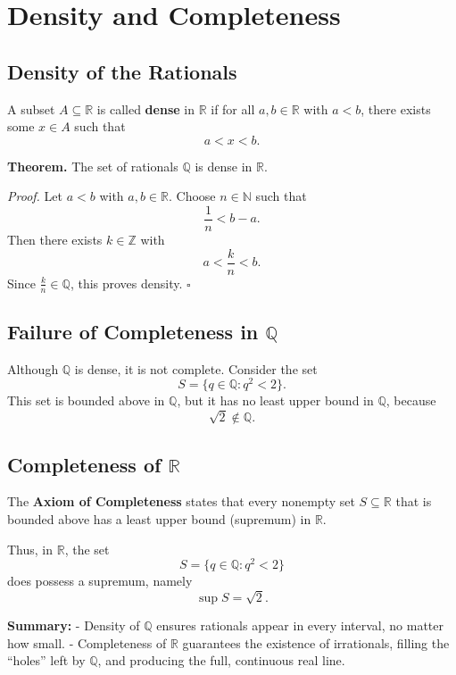 \documentclass[a4paper,12pt]{article}
\begin{document}
\section*{Density and Completeness}

\subsection*{Density of the Rationals}

A subset \(A \subseteq \mathbb{R}\) is called \textbf{dense} in \(\mathbb{R}\) if for all \(a,b \in \mathbb{R}\) with \(a < b\), there exists some \(x \in A\) such that
$$
a < x < b.
$$

\textbf{Theorem.} The set of rationals \(\mathbb{Q}\) is dense in \(\mathbb{R}\).

\textit{Proof.}  
Let \(a < b\) with \(a,b \in \mathbb{R}\). Choose \(n \in \mathbb{N}\) such that
$$
\frac{1}{n} < b - a.
$$
Then there exists \(k \in \mathbb{Z}\) with
$$
a < \frac{k}{n} < b.
$$
Since \(\tfrac{k}{n} \in \mathbb{Q}\), this proves density. \(\square\)

\subsection*{Failure of Completeness in \(\mathbb{Q}\)}

Although \(\mathbb{Q}\) is dense, it is not complete.  
Consider the set
$$
S = \{ q \in \mathbb{Q} : q^2 < 2 \}.
$$
This set is bounded above in \(\mathbb{Q}\), but it has no least upper bound in \(\mathbb{Q}\), because
$$
\sqrt{2} \notin \mathbb{Q}.
$$

\subsection*{Completeness of \(\mathbb{R}\)}

The \textbf{Axiom of Completeness} states that every nonempty set \(S \subseteq \mathbb{R}\) that is bounded above has a least upper bound (supremum) in \(\mathbb{R}\).  

Thus, in \(\mathbb{R}\), the set
$$
S = \{ q \in \mathbb{Q} : q^2 < 2 \}
$$
does possess a supremum, namely
$$
\sup S = \sqrt{2}.
$$

\bigskip

\textbf{Summary:}  
- Density of \(\mathbb{Q}\) ensures rationals appear in every interval, no matter how small.  
- Completeness of \(\mathbb{R}\) guarantees the existence of irrationals, filling the “holes” left by \(\mathbb{Q}\), and producing the full, continuous real line.
\end{document}
